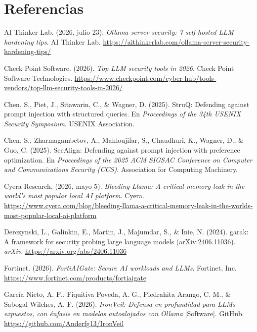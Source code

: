\documentclass[11pt,letterpaper]{article}
\newcommand{\refapa}[1]{%
  \par\noindent\hangindent=1.25cm\hangafter=1 #1\par\vspace{0.5em}%
}
\begin{document}
\clearpage
\section*{Referencias}

{\small

\hypertarget{aithinkerlab2026}{}\refapa{AI Thinker Lab. (2026, julio 23). \emph{Ollama server security: 7 self-hosted LLM hardening tips}. AI Thinker Lab. \url{https://aithinkerlab.com/ollama-server-security-hardening-tips/}}

\hypertarget{checkpoint2026}{}\refapa{Check Point Software. (2026). \emph{Top LLM security tools in 2026}. Check Point Software Technologies. \url{https://www.checkpoint.com/cyber-hub/tools-vendors/top-llm-security-tools-in-2026/}}

\hypertarget{struq2025}{}\refapa{Chen, S., Piet, J., Sitawarin, C., \& Wagner, D. (2025). StruQ: Defending against prompt injection with structured queries. En \emph{Proceedings of the 34th USENIX Security Symposium}. USENIX Association.}

\hypertarget{secalign2025}{}\refapa{Chen, S., Zharmagambetov, A., Mahloujifar, S., Chaudhuri, K., Wagner, D., \& Guo, C. (2025). SecAlign: Defending against prompt injection with preference optimization. En \emph{Proceedings of the 2025 ACM SIGSAC Conference on Computer and Communications Security (CCS)}. Association for Computing Machinery.}

\hypertarget{cyera2026}{}\refapa{Cyera Research. (2026, mayo 5). \emph{Bleeding Llama: A critical memory leak in the world's most popular local AI platform}. Cyera. \url{https://www.cyera.com/blog/bleeding-llama-a-critical-memory-leak-in-the-worlds-most-popular-local-ai-platform}}

\hypertarget{garak2024}{}\refapa{Derczynski, L., Galinkin, E., Martin, J., Majumdar, S., \& Inie, N. (2024). garak: A framework for security probing large language models (arXiv:2406.11036). \emph{arXiv}. \url{https://arxiv.org/abs/2406.11036}}

\hypertarget{fortinet2026}{}\refapa{Fortinet. (2026). \emph{FortiAIGate: Secure AI workloads and LLMs}. Fortinet, Inc. \url{https://www.fortinet.com/products/fortiaigate}}

\hypertarget{garcia2026}{}\refapa{García Nieto, A. F., Fiquitiva Poveda, A. G., Piedrahita Arango, C. M., \& Sabogal Wilches, A. F. (2026). \emph{IronVeil: Defensa en profundidad para LLMs expuestos, con énfasis en modelos autoalojados con Ollama} [Software]. GitHub. \url{https://github.com/Anderfg13/IronVeil}}

}
\end{document}
